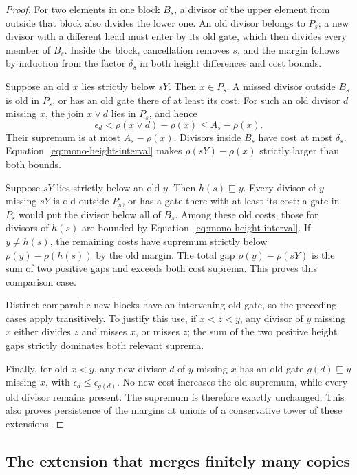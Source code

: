 \begin{proof}
For two elements in one block $B_s$, a divisor of the upper element
from outside that block also divides the lower one.  An old divisor
belongs to $P_s$; a new divisor with a different head must enter by
its old gate, which then divides every member of $B_s$.
Inside the block, cancellation removes $s$, and the margin follows
by induction from the factor $\delta_s$ in both height differences
and cost bounds.

Suppose an old $x$ lies strictly below $sY$.  Then $x\in P_s$.
A missed divisor outside $B_s$ is old in $P_s$, or has an old gate
there of at least its cost.  For such an old divisor $d$ missing
$x$, the join $x\vee d$ lies in $P_s$, and hence
\[
 \epsilon_d<\rho(x\vee d)-\rho(x)\leq A_s-\rho(x).
\]
Their supremum is at most $A_s-\rho(x)$.  Divisors inside $B_s$
have cost at most $\delta_s$.  Equation~\eqref{eq:mono-height-interval}
makes $\rho(sY)-\rho(x)$ strictly larger than both bounds.

Suppose $sY$ lies strictly below an old $y$.  Then
$h(s)\sqsubseteq y$.  Every divisor of $y$ missing $sY$ is old
outside $P_s$, or has a gate there with at least its cost: a gate
in $P_s$ would put the divisor below all of $B_s$.
Among these old costs, those for divisors of $h(s)$ are bounded by
Equation~\eqref{eq:mono-height-interval}.  If $y\ne h(s)$, the
remaining costs have supremum strictly below
$\rho(y)-\rho(h(s))$ by the old margin.  The total gap
$\rho(y)-\rho(sY)$ is the sum of two positive gaps and exceeds both
cost suprema.  This proves this comparison case.

Distinct comparable new blocks have an intervening old gate, so the
preceding cases apply transitively.  To justify this use, if
$x<z<y$, any divisor of $y$ missing $x$ either divides $z$ and
misses $x$, or misses $z$; the sum of the two positive height gaps
strictly dominates both relevant suprema.

Finally, for old $x<y$, any new divisor $d$ of $y$ missing $x$
has an old gate $g(d)\sqsubseteq y$ missing $x$, with
$\epsilon_d\leq\epsilon_{g(d)}$.  No new cost increases the old
supremum, while every old divisor remains present.  The supremum is
therefore exactly unchanged.  This also proves persistence of the
margins at unions of a conservative tower of these extensions.
\end{proof}

\subsection{The extension that merges finitely many copies}

